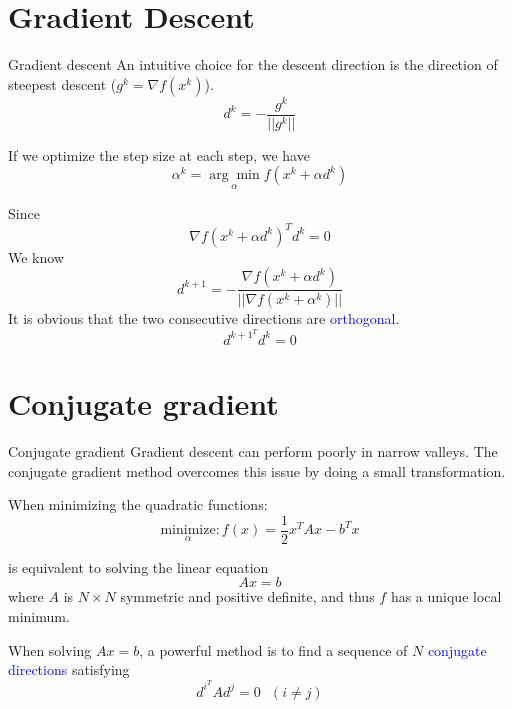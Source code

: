 \documentclass{beamer}
\begin{document}
\section{Gradient Descent}
\begin{frame}{Gradient descent}
An intuitive choice for the descent direction is the direction of steepest descent ($g^k = \nabla f(x^k)$).
\begin{equation*}
    d^k = - \frac{g^k}{||g^k||}
\end{equation*}

If we optimize the step size at each step, we have
\begin{equation*}
    \alpha^k = \underset{\alpha}{\arg \min} f(x^k + \alpha d^k)
\end{equation*}

Since 
\begin{equation*}
    \nabla f(x^k + \alpha d^k)^T d^k = 0
\end{equation*}
We know
\begin{equation*}
    d^{k+1} = - \frac{\nabla f(x^k + \alpha d^k)}{||\nabla f(x^k + \alpha^k)||}
\end{equation*}
It is obvious that the two consecutive directions are \textcolor{blue}{orthogonal}.
\begin{equation*}
    d^{k+1}^T d^k = 0
\end{equation*}

\end{frame}

\section{Conjugate gradient}
\begin{frame}{Conjugate gradient}
Gradient descent can perform poorly in narrow valleys. The conjugate gradient method overcomes this issue by doing a small transformation.

When minimizing the quadratic functions:
\begin{equation*}
    \underset{\alpha}{\textrm{minimize}}: f(x) = \frac{1}{2} x^T A x - b^T x 
\end{equation*}

is equivalent to solving the linear equation
\begin{equation*}
    Ax = b
\end{equation*}
where $A$ is $N \times N$ symmetric and positive definite, and thus $f$ has a unique local minimum.

When solving $Ax = b$, a powerful method is to find a sequence of $N$ \textcolor{blue}{conjugate directions} satisfying 
\begin{equation*}
    d^i^T A d^j = 0 ~~~ (i\neq j)
\end{equation*}

\end{frame}
\end{document}
